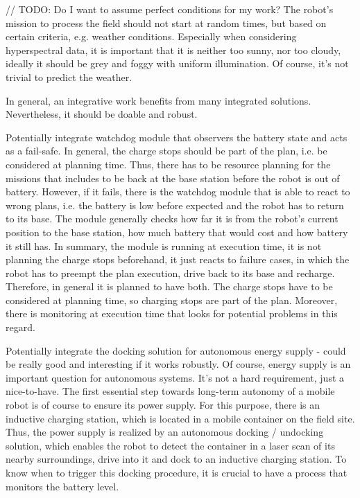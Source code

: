 \documentclass[german, master, expose, latin1]{base/thesis_KBS}
\begin{document}
// TODO: Do I want to assume perfect conditions for my work?
The robot's mission to process the field should not start at random times, but based on certain criteria, e.g. weather conditions.
Especially when considering hyperspectral data, it is important that it is neither too sunny, nor too cloudy, ideally it should be grey and
foggy with uniform illumination. Of course, it's not trivial to predict the weather.\newline

In general, an integrative work benefits from many integrated solutions. Nevertheless, it should be doable and robust.\newline

Potentially integrate watchdog module that observers the battery state and acts as a fail-safe. In general, the charge stops should be part of the plan,
i.e. be considered at planning time. Thus, there has to be resource planning for the missions that includes to be back at the base station before the robot is out of battery.
However, if it fails, there is the watchdog module that is able to react to wrong plans, i.e. the battery is low before expected and the robot has to return to its base.
The module generally checks how far it is from the robot's current position to the base station, how much battery that would cost and how battery it still has.
In summary, the module is running at execution time, it is not planning the charge stops beforehand, it just reacts to failure cases, in which the robot has to preempt
the plan execution, drive back to its base and recharge. Therefore, in general it is planned to have both. The charge stops have to be considered at planning time,
so charging stops are part of the plan. Moreover, there is monitoring at execution time that looks for potential problems in this regard.\newline

Potentially integrate the docking solution for autonomous energy supply - could be really good and interesting if it works robustly.
Of course, energy supply is an important question for autonomous systems. It's not a hard requirement, just a nice-to-have.
The first essential step towards long-term autonomy of a mobile robot is of course to ensure its power supply.
For this purpose, there is an inductive charging station, which is located in a mobile container on the field site.
Thus, the power supply is realized by an autonomous docking / undocking solution, which enables the robot to detect the container in a laser scan
of its nearby surroundings, drive into it and dock to an inductive charging station.
To know when to trigger this docking procedure, it is crucial to have a process that monitors the battery level.\newline
\end{document}
